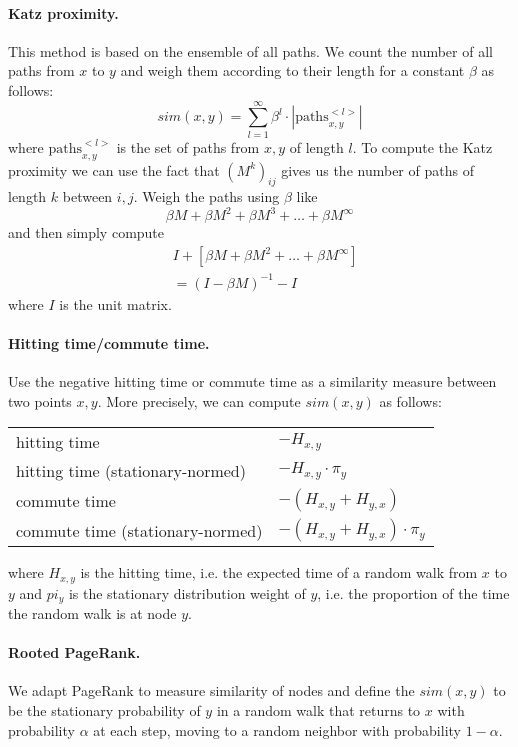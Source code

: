 \paragraph{Katz proximity.} This method is based on the ensemble of all paths. We count the number of all paths from $x$ to $y$ and weigh them according to their length for a constant $\beta$ as follows:
$$
sim(x,y) = \sum_{l=1}^{\infty} \beta^l \cdot |\text{paths}_{x,y}^{<l>}|
$$
where $\text{paths}_{x,y}^{<l>}$ is the set of paths from $x,y$ of length $l$. To compute the Katz proximity we can use the fact that $(M^k)_{ij}$ gives us the number of paths of length $k$ between $i,j$. Weigh the paths using $\beta$ like
$$
\beta M + \beta M^2 + \beta M^3 + \ldots + \beta M^{\infty}
$$
and then simply compute
\begin{align*} 
    & I + [ \beta M + \beta M^2 + \ldots + \beta M^{\infty}]\\
    &= (I - \beta M)^{-1} - I
\end{align*}
where $I$ is the unit matrix.

\paragraph{Hitting time/commute time.} Use the negative hitting time or commute time as a similarity measure between two points $x,y$. More precisely, we can compute $sim(x,y)$ as follows:
\begin{center}
\begin{tabular}{ l l }
    hitting time & $-H_{x,y}$ \\
    hitting time (stationary-normed) & $-H_{x,y} \cdot \pi_y$ \\
    commute time & $-(H_{x,y} + H_{y,x})$ \\
    commute time (stationary-normed) & $-(H_{x,y} + H_{y,x}) \cdot \pi_y$ 
\end{tabular}
\end{center}
where $H_{x,y}$ is the hitting time, i.e. the expected time of a random walk from $x$ to $y$ and $pi_y$ is the stationary distribution weight of $y$, i.e. the proportion of the time the random walk is at node $y$.

\paragraph{Rooted PageRank.} We adapt PageRank to measure similarity of nodes and define the $sim(x,y)$ to be the stationary probability of $y$ in a random walk that returns to $x$ with probability $\alpha$ at each step, moving to a random neighbor with probability $1 - \alpha$.

